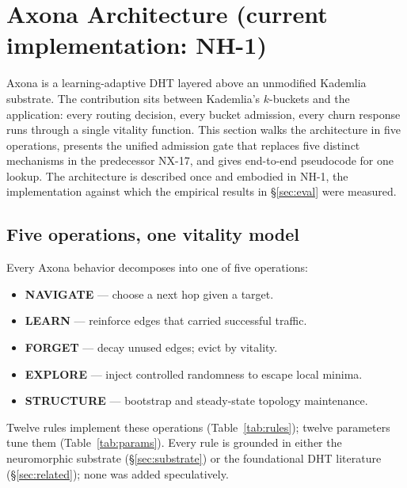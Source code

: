 \documentclass[conference]{IEEEtran}
\newcommand{\axona}{Axona\xspace}
\newcommand{\nhone}{NH-1\xspace}
\newcommand{\NXseventeen}{NX-17\xspace}
\begin{document}
\section{\axona Architecture (current implementation: \nhone)}
\label{sec:nh1}

\axona is a learning-adaptive DHT layered above an unmodified Kademlia
substrate. The contribution sits between Kademlia's $k$-buckets and the
application: every routing decision, every bucket admission, every churn
response runs through a single vitality function. This section walks the
architecture in five operations, presents the unified admission gate that
replaces five distinct mechanisms in the predecessor \NXseventeen, and
gives end-to-end pseudocode for one lookup. The architecture is described
once and embodied in \nhone, the implementation against which the
empirical results in \S\ref{sec:eval} were measured.

\subsection{Five operations, one vitality model}
\label{sec:nh1-overview}

Every \axona behavior decomposes into one of five operations:

\begin{itemize}
\item \textbf{NAVIGATE} --- choose a next hop given a target.
\item \textbf{LEARN} --- reinforce edges that carried successful traffic.
\item \textbf{FORGET} --- decay unused edges; evict by vitality.
\item \textbf{EXPLORE} --- inject controlled randomness to escape local minima.
\item \textbf{STRUCTURE} --- bootstrap and steady-state topology maintenance.
\end{itemize}

\noindent
Twelve rules implement these operations (Table~\ref{tab:rules}); twelve
parameters tune them (Table~\ref{tab:params}). Every rule is grounded in
either the neuromorphic substrate (\S\ref{sec:substrate}) or the foundational
DHT literature (\S\ref{sec:related}); none was added speculatively.
\end{document}
